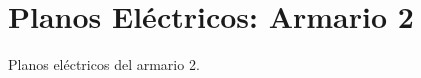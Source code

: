 
\chapter{Planos Eléctricos: Armario 2} %

\label{app:planosEle2} %

Planos eléctricos del armario 2.

\newpage


